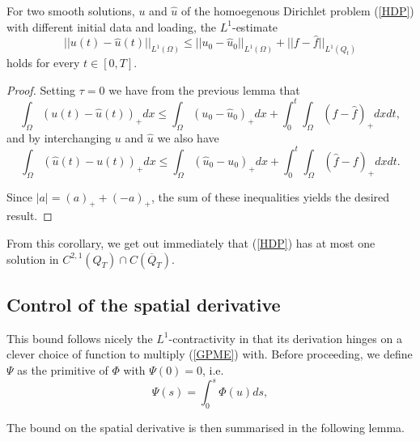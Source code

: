 \documentclass[11pt, a4paper]{article}
\begin{document}
\begin{cor}[$L^1$-contractivity]
For two smooth solutions, $u$ and $\hat{u}$ of the homoegenous Dirichlet problem (\ref{HDP}) with different initial data and loading, the $L^1$-estimate
\begin{equation}
\label{l1_contractivity}
||u(t) - \hat{u}(t)||_{L^1(\Omega)} \leq ||u_0 - \hat{u}_0||_{L^1(\Omega)} + ||f-\hat{f}||_{L^1(Q_t)}
\end{equation}
holds for every $t\in [0,T]$.
\end{cor}

\begin{proof}
Setting $\tau = 0$ we have from the previous lemma that
\begin{equation*}
\int_\Omega  (u(t)-\hat{u}(t))_+dx \leq \int_\Omega (u_0 - \hat{u}_0)_+dx + \int_0^t \int_\Omega (f-\hat{f})_+ dxdt,
\end{equation*}
and by interchanging $u$ and $\hat{u}$ we also have 
\begin{equation*}
\int_\Omega  (\hat{u}(t)-u(t))_+dx \leq \int_\Omega (\hat{u}_0 - u_0)_+dx + \int_0^t \int_\Omega (\hat{f}-f)_+ dxdt.
\end{equation*}

Since $|a| = (a)_+ + (-a)_+$, the sum of these inequalities yields the desired result.
\end{proof}

\setcounter{obs}{0}
\begin{obs}
From this corollary, we get out immediately that (\ref{HDP}) has at most one solution in $C^{2,1}(Q_T)\cap C(\overline{Q}_T)$.
\end{obs}

\subsection{Control of the spatial derivative}
This bound follows nicely the $L^1$-contractivity in that its derivation hinges on a clever choice of function to multiply (\ref{GPME}) with. Before proceeding, we define  $\Psi$ as the primitive of $\Phi$ with $\Psi(0) = 0$, i.e.
\begin{equation}
\label{phi_primitive}
	\Psi(s) = \int_0^s \Phi(u) ds,
\end{equation}

The bound on the spatial derivative is then summarised in the following lemma.
\end{document}
